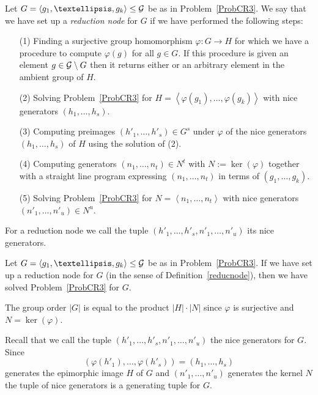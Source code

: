 \begin{Def}
\label{reducnode}
Let $G = \left< g_1, \ldots, g_k \right> \le \GG$ be as in 
Problem~\ref{ProbCR3}.
We say that we have set up a \emph{reduction node} for $G$ if we have
performed the following steps:
\begin{itemize}
\item[(1)] Finding a surjective group homomorphism $\varphi : G \to H$ for
which we have a procedure to compute $\varphi(g)$ for all $g \in G$.
If this procedure is given an element $g \in \mathcal{G} \setminus G$ then it
returns either {\fail} or an arbitrary element in the ambient group of $H$.
\item[(2)] Solving Problem~\ref{ProbCR3} for $H = \left< \varphi(g_1),
\ldots, \varphi(g_k) \right>$ with nice generators $(h_1, \ldots, h_s)$.
\item[(3)] Computing preimages $(h'_1, \ldots, h'_s) \in G^s$ under $\varphi$
of the nice generators $(h_1, \ldots, h_s)$ of $H$ using the solution
of (2).
\item[(4)] Computing generators $(n_1, \ldots, n_t) \in N^t$ with $N :=
\ker(\varphi)$ together with a straight line program expressing
$(n_1, \ldots, n_t)$ in terms of $(g_1, \ldots, g_k)$.
\item[(5)] Solving Problem~\ref{ProbCR3} for $N = \left< n_1, \ldots, n_t
\right>$ with nice generators $(n'_1, \ldots, n'_u) \in N^u$.
\end{itemize}
For a reduction node we call the tuple $(h'_1, \ldots, h'_s, n'_1, \ldots,
n'_u)$ its nice generators.
\end{Def}

\begin{Prop}
Let $G = \left< g_1, \ldots, g_k \right> \le \GG$ be as in 
Problem~\ref{ProbCR3}.
If we have set up a reduction node for $G$ (in the sense of
Definition~\ref{reducnode}), then we have solved
Problem~\ref{ProbCR3} for $G$.
\end{Prop}
\proofbeg
The group order $|G|$ is equal to the product $|H| \cdot |N|$ since
$\varphi$ is surjective and $N = \ker(\varphi)$.

Recall that we call the tuple $(h'_1, \ldots, h'_s, n'_1, \ldots, n'_u)$
the nice generators for $G$. Since 
\[ (\varphi(h'_1), \ldots, \varphi(h'_s))
= (h_1, \ldots, h_s) \] 
generates the epimorphic image $H$ of $G$ and
$(n'_1, \ldots, n'_u)$ generates the kernel $N$ the tuple of nice
generators is a generating tuple for $G$.

